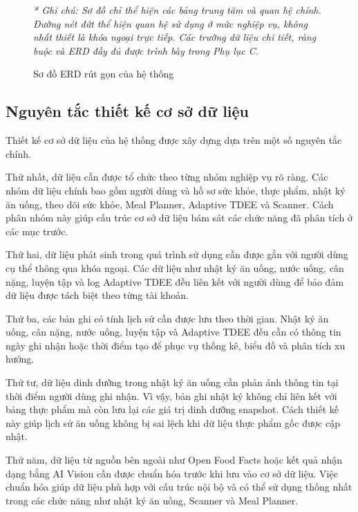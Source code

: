 \documentclass[12pt, a4paper]{report}
\begin{document}
\begin{figure}[htbp]
{
    }
    \caption{Sơ đồ ERD rút gọn của hệ thống}
    \label{fig:erd_rut_gon}
    
    \vspace{0.2cm}
    \small \textit{* Ghi chú: Sơ đồ chỉ thể hiện các bảng trung tâm và quan hệ chính. Đường nét đứt thể hiện quan hệ sử dụng ở mức nghiệp vụ, không nhất thiết là khóa ngoại trực tiếp. Các trường dữ liệu chi tiết, ràng buộc và ERD đầy đủ được trình bày trong Phụ lục C.}
\end{figure}

\subsection{Nguyên tắc thiết kế cơ sở dữ liệu}Thiết kế cơ sở dữ liệu của hệ thống được xây dựng dựa trên một số nguyên tắc chính.

Thứ nhất, dữ liệu cần được tổ chức theo từng nhóm nghiệp vụ rõ ràng. Các nhóm dữ liệu chính bao gồm người dùng và hồ sơ sức khỏe, thực phẩm, nhật ký ăn uống, theo dõi sức khỏe, Meal Planner, Adaptive TDEE và Scanner. Cách phân nhóm này giúp cấu trúc cơ sở dữ liệu bám sát các chức năng đã phân tích ở các mục trước.

Thứ hai, dữ liệu phát sinh trong quá trình sử dụng cần được gắn với người dùng cụ thể thông qua khóa ngoại. Các dữ liệu như nhật ký ăn uống, nước uống, cân nặng, luyện tập và log Adaptive TDEE đều liên kết với người dùng để bảo đảm dữ liệu được tách biệt theo từng tài khoản.

Thứ ba, các bản ghi có tính lịch sử cần được lưu theo thời gian. Nhật ký ăn uống, cân nặng, nước uống, luyện tập và Adaptive TDEE đều cần có thông tin ngày ghi nhận hoặc thời điểm tạo để phục vụ thống kê, biểu đồ và phân tích xu hướng.

Thứ tư, dữ liệu dinh dưỡng trong nhật ký ăn uống cần phản ánh thông tin tại thời điểm người dùng ghi nhận. Vì vậy, bản ghi nhật ký không chỉ liên kết với bảng thực phẩm mà còn lưu lại các giá trị dinh dưỡng snapshot. Cách thiết kế này giúp lịch sử ăn uống không bị sai lệch khi dữ liệu thực phẩm gốc được cập nhật.

Thứ năm, dữ liệu từ nguồn bên ngoài như Open Food Facts hoặc kết quả nhận dạng bằng AI Vision cần được chuẩn hóa trước khi lưu vào cơ sở dữ liệu. Việc chuẩn hóa giúp dữ liệu phù hợp với cấu trúc nội bộ và có thể sử dụng thống nhất trong các chức năng như nhật ký ăn uống, Scanner và Meal Planner.
\end{document}
